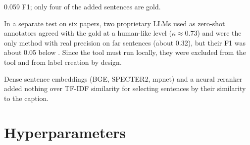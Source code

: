 \begin{description}[leftmargin=1.2em,style=nextline,itemsep=3pt]
        0.059 F1; only four of the added sentences are gold.
  \item[Frontier LLMs as annotators] In a separate test on six papers, two proprietary LLMs used as zero-shot
        annotators agreed with the gold at a human-like level ($\kappa\approx0.73$) and were the only method
        with real precision on far sentences (about 0.32), but their F1 was about 0.05 below \bof{}. Since
        the tool must run locally, they were excluded from the tool and from label creation by design.
  \item[Embedding retrievers] Dense sentence embeddings (BGE, SPECTER2, mpnet) and a neural reranker added
        nothing over TF-IDF similarity for selecting sentences by their similarity to the caption.
\end{description}

\section{Hyperparameters}
\label{app:hyper}

